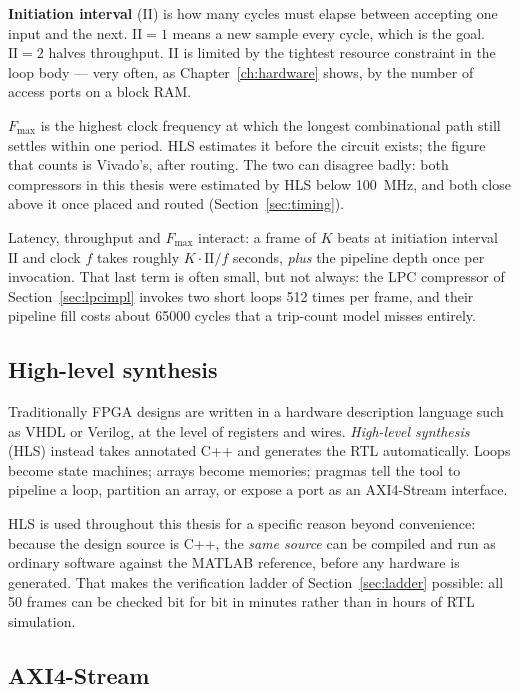 \textbf{Initiation interval} (II) is how many cycles must elapse between
accepting one input and the next. $\mathrm{II} = 1$ means a new sample every
cycle, which is the goal. $\mathrm{II} = 2$ halves throughput. II is limited by
the tightest resource constraint in the loop body --- very often, as
Chapter~\ref{ch:hardware} shows, by the number of access ports on a block RAM.

\textbf{$F_{\max}$} is the highest clock frequency at which the longest
combinational path still settles within one period. HLS estimates it before
the circuit exists; the figure that counts is Vivado's, after routing. The two
can disagree badly: both compressors in this thesis were estimated by HLS below
\SI{100}{\mega\hertz}, and both close above it once placed and routed
(Section~\ref{sec:timing}).

Latency, throughput and $F_{\max}$ interact: a frame of $K$ beats at
initiation interval $\mathrm{II}$ and clock $f$ takes roughly
$K \cdot \mathrm{II} / f$ seconds, \emph{plus} the pipeline depth once per
invocation. That last term is often small, but not always: the LPC compressor
of Section~\ref{sec:lpcimpl} invokes two short loops 512 times per frame, and
their pipeline fill costs about \num{65000} cycles that a trip-count model
misses entirely.

\subsection{High-level synthesis}

Traditionally FPGA designs are written in a hardware description language such
as VHDL or Verilog, at the level of registers and wires. \emph{High-level
synthesis} (HLS) instead takes annotated C++ and generates the RTL
automatically. Loops become state machines; arrays become memories; pragmas
tell the tool to pipeline a loop, partition an array, or expose a port as an
AXI4-Stream interface.

HLS is used throughout this thesis for a specific reason beyond convenience:
because the design source is C++, the \emph{same source} can be compiled and
run as ordinary software against the MATLAB reference, before any hardware is
generated. That makes the verification ladder of Section~\ref{sec:ladder}
possible: all 50 frames can be checked bit for bit in minutes rather than in
hours of RTL simulation.

\subsection{AXI4-Stream}

